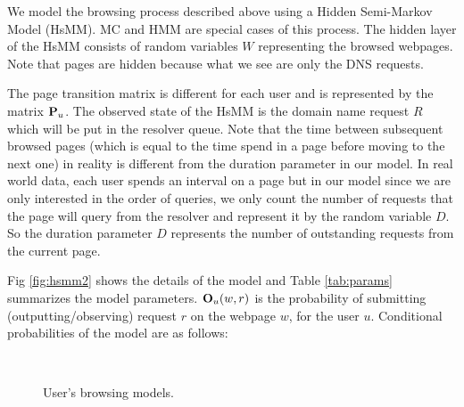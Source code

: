         We model the browsing process described above
        using a Hidden Semi-Markov Model (HsMM).  MC and HMM are
        special cases of this process.  The hidden layer of the HsMM
        consists of random variables $W$ representing the browsed
        webpages.  Note that pages are hidden because what we see are
        only the DNS requests.

	
	The page transition matrix is different for each user and is
        represented by the matrix $\P_u$.  
        The observed state of the HsMM is the domain name request $R$
        which will be put in the resolver queue.
	Note that the time between subsequent browsed pages (which is equal to the time spend in a page before moving to the next one) in reality is different from the duration parameter in our model.
	In real world data, each user spends an interval on a page but in our model since we are only interested in the order of queries, we only count the number of requests that the page will query from the resolver and represent it by the random variable $D$.
	So the duration parameter $D$ represents the number of outstanding requests from the current page.
	
	
	Fig \ref{fig:hsmm2} shows the details of the model and Table \ref{tab:params} summarizes the model parameters.
	$\O_u(w, r)$  is the probability of submitting (outputting/observing) request $r$ on the webpage $w$, for the user $u$.	
	Conditional probabilities of the model are as follows:	
	\begin{figure}
	\centering
	~
	~
	\caption{User's browsing models.}
	\label{fig:hsmm}
\end{figure}	
	
